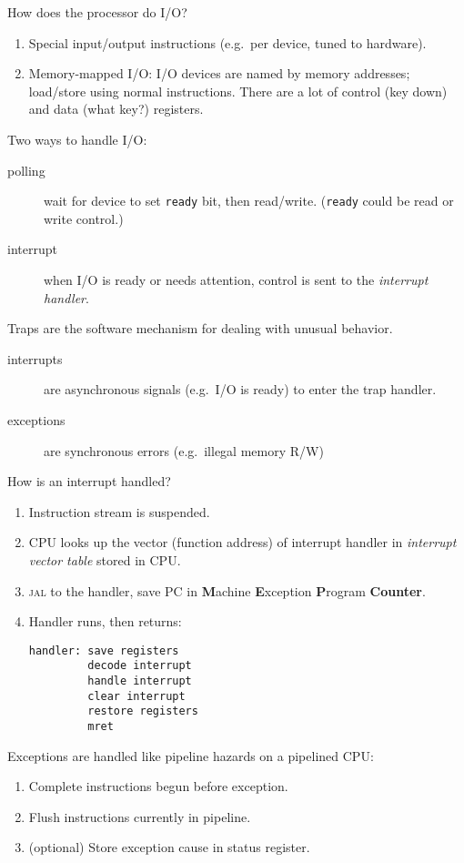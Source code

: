 How does the processor do I/O?
\begin{enumerate}
	\item Special input/output instructions (e.g.~per device, tuned to hardware).
	\item Memory-mapped I/O: I/O devices are named by memory addresses; load/store using normal instructions. There are a lot of control (key down) and data (what key?) registers.
\end{enumerate}
Two ways to handle I/O:
\begin{description}
	\item[polling] wait for device to set \texttt{ready} bit, then read/write. (\texttt{ready} could be read or write control.)
	\item[interrupt] when I/O is ready or needs attention, control is sent to the \emph{interrupt handler}.
\end{description}
Traps are the software mechanism for dealing with unusual behavior.
\begin{description}
	\item[interrupts] are asynchronous signals (e.g.~I/O is ready) to enter the trap handler.
	\item[exceptions] are synchronous errors (e.g.~illegal memory R/W)
\end{description}
How is an interrupt handled?
\begin{enumerate}
	\item Instruction stream is suspended.
	\item CPU looks up the vector (function address) of interrupt handler in \emph{interrupt vector table} stored in CPU.
	\item \textsc{jal} to the handler, save PC in \textbf{M}achine \textbf{E}xception \textbf{P}rogram \textbf{Counter}.
	\item Handler runs, then returns:
\begin{verbatim}
handler: save registers
         decode interrupt
         handle interrupt
         clear interrupt
         restore registers
         mret
\end{verbatim}
\end{enumerate}
Exceptions are handled like pipeline hazards on a pipelined CPU:
\begin{enumerate}
	\item Complete instructions begun before exception.
	\item Flush instructions currently in pipeline.
	\item (optional) Store exception cause in status register.
\end{enumerate}
